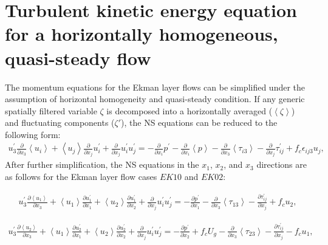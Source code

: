 
\chapter{Turbulent kinetic energy equation for a horizontally homogeneous, quasi-steady flow}
\label{app:A_tke}

The momentum equations for the Ekman layer flows can be simplified under the assumption of horizontal homogeneity and quasi-steady condition. If any generic spatially filtered variable $\zeta$ is decomposed into a horizontally  averaged ($\left< \zeta \right>$) and fluctuating components ($\zeta\prime$), the NS equations can be reduced  to the following form:         
\begin{align}
    u^{\prime}_3\frac{\partial }{\partial x_3}\left < u_i \right > + \left < u_j \right > \frac{\partial}{\partial x_j} u_i^{\prime} + \frac{\partial }{\partial x_j} u_i^{\prime}u_j^{\prime} = -\frac{\partial }{\partial x_i} p^{\prime} - \frac{\partial }{\partial x_i} \left < p \right > - \frac{\partial }{\partial x_3} \left < \tau_{i3}\right > - \frac{\partial }{\partial x_j} \tau_{ij}^{\prime}+f_c\epsilon_{ij3}u_j,
\end{align}
\noindent After further simplification, the NS equations in the $x_1$, $x_2$, and $x_3$ directions are as follows for the Ekman layer flow cases $EK10$ and $EK02$:

\begin{align}
   u^{\prime}_3\frac{\partial \left < u_1 \right >}{\partial x_3} + \left < u_1 \right > \frac{\partial u_1^{\prime}}{\partial x_1} + \left < u_2 \right > \frac{\partial u_1^{\prime} }{\partial x_2} + \frac{\partial }{\partial x_j} u_i^{\prime}u_j^{\prime} = -\frac{\partial p^{\prime}}{\partial x_1}  - \frac{\partial }{\partial x_3} \left < \tau_{13}\right > - \frac{\partial \tau_{ij}^{\prime}}{\partial x_j} +f_cu_2,
\end{align}

\begin{align}
   u^{\prime}_3\frac{\partial \left < u_2 \right > }{\partial x_3}+ \left < u_1 \right > \frac{\partial u_2^{\prime}}{\partial x_1}  + \left < u_2 \right > \frac{\partial u_2^{\prime} }{\partial x_2} + \frac{\partial }{\partial x_j} u_i^{\prime}u_j^{\prime} = -\frac{\partial p^{\prime} }{\partial x_2} + f_c U_g - \frac{\partial }{\partial x_3} \left < \tau_{23}\right > - \frac{\partial \tau_{ij}^{\prime}}{\partial x_j} -f_cu_1,
\end{align}

